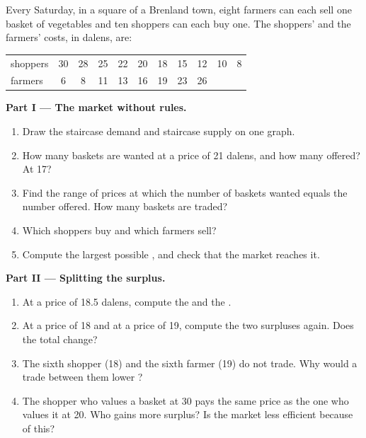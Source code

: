 \begin{problem}
\label{pb:g10:surplus-and-efficiency:1}
Every Saturday, in a square of a Brenland town, eight farmers can each sell one basket of vegetables and ten shoppers can each buy one. The shoppers'
 and the farmers' costs, in dalens, are:
\begin{center}
\small
\begin{tabular}{l c c c c c c c c c c}
\toprule
shoppers & 30 & 28 & 25 & 22 & 20 & 18 & 15 & 12 & 10 & 8 \\
farmers  & 6 & 8 & 11 & 13 & 16 & 19 & 23 & 26 & & \\
\bottomrule
\end{tabular}
\end{center}

\medskip
\noindent\textbf{Part I --- The market without rules.}
\begin{enumerate}
\item Draw the staircase demand and staircase supply on one graph.
\item How many baskets are wanted at a price of 21 dalens, and how many offered? At 17?
\item Find the range of prices at which the number of baskets wanted equals the number offered. How many baskets are traded?
\item Which shoppers buy and which farmers sell?
\item Compute the largest possible , and check that the market reaches it.
\end{enumerate}

\medskip
\noindent\textbf{Part II --- Splitting the surplus.}
\begin{enumerate}[resume]
\item At a price of 18.5 dalens, compute the  and the .
\item At a price of 18 and at a price of 19, compute the two surpluses again. Does the total change?
\item The sixth shopper (18) and the sixth farmer (19) do not trade. Why would a trade between them lower ?
\item The shopper who values a basket at 30 pays the same price as the one who values it at 20. Who gains more surplus? Is the market less efficient
  because of this?
\end{enumerate}


\end{problem}
